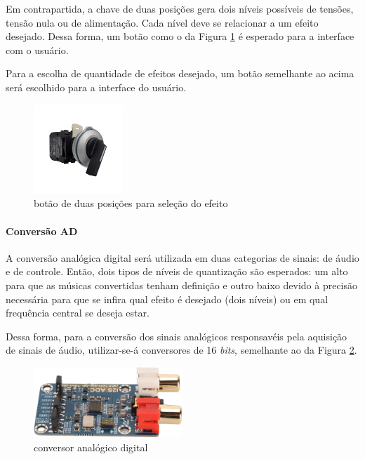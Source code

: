    Em contrapartida, a chave de duas posições gera dois níveis possíveis de tensões, tensão nula ou de alimentação. Cada nível deve se relacionar a um efeito desejado. Dessa forma, um botão como o da Figura \ref{fig62} é esperado para a interface com o usuário.

    Para a escolha de quantidade de efeitos desejado, um botão semelhante ao acima será escolhido para a interface do usuário.

    \begin{figure}[h]
        \centering
        \includegraphics[width=0.3\textwidth]{figuras/fig62.png}
        \caption{botão de duas posições para seleção do efeito}
        \label{fig62}
    \end{figure}


    \paragraph{Conversão AD}

    A conversão analógica digital será utilizada em duas categorias de sinais: de áudio e de controle. Então, dois tipos de níveis de quantização são esperados: um alto para que as músicas convertidas tenham definição e outro baixo devido à precisão necessária para que se infira qual efeito é desejado (dois níveis) ou em qual frequência central se deseja estar.

    Dessa forma, para a conversão dos sinais analógicos responsavéis pela aquisição de sinais de áudio, utilizar-se-á conversores de 16 \textit{bits}, semelhante ao da Figura \ref{fig63}.
    
    \begin{figure}[h]
        \centering
        \includegraphics[width=0.5\textwidth]{figuras/fig63.jpg}
        \caption{conversor analógico digital}
        \label{fig63}
    \end{figure}    
    
